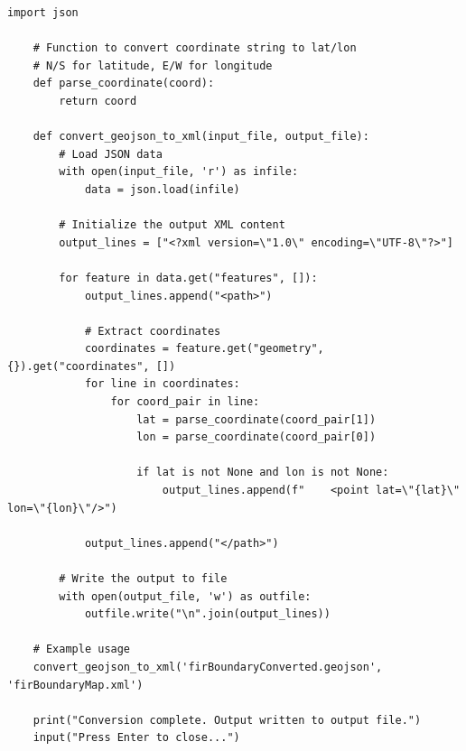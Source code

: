 \documentclass[stu, a4paper, 12pt, floatsintext]{apa7}
\numberwithin{figure}{section}
\numberwithin{table}{section}
\numberwithin{equation}{section}
\begin{document}
\begin{lstlisting}[style=mypython, caption={Convert GeoJSON to Simple XML Format}]
    import json
    
    # Function to convert coordinate string to lat/lon
    # N/S for latitude, E/W for longitude
    def parse_coordinate(coord):
        return coord
    
    def convert_geojson_to_xml(input_file, output_file):
        # Load JSON data
        with open(input_file, 'r') as infile:
            data = json.load(infile)
    
        # Initialize the output XML content
        output_lines = ["<?xml version=\"1.0\" encoding=\"UTF-8\"?>"]
    
        for feature in data.get("features", []):
            output_lines.append("<path>")
    
            # Extract coordinates
            coordinates = feature.get("geometry", {}).get("coordinates", [])
            for line in coordinates:
                for coord_pair in line:
                    lat = parse_coordinate(coord_pair[1])
                    lon = parse_coordinate(coord_pair[0])
    
                    if lat is not None and lon is not None:
                        output_lines.append(f"    <point lat=\"{lat}\" lon=\"{lon}\"/>")
    
            output_lines.append("</path>")
    
        # Write the output to file
        with open(output_file, 'w') as outfile:
            outfile.write("\n".join(output_lines))
    
    # Example usage
    convert_geojson_to_xml('firBoundaryConverted.geojson', 'firBoundaryMap.xml')
    
    print("Conversion complete. Output written to output file.")
    input("Press Enter to close...")
\end{lstlisting}
\newpage
\end{document}
